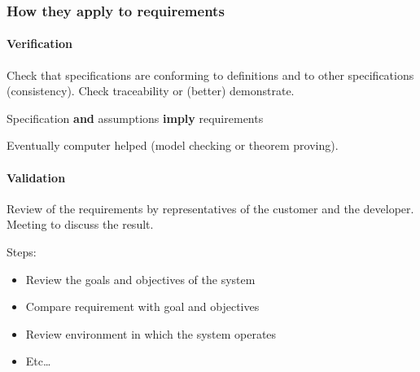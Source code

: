 \subsubsection{How they apply to requirements}

\paragraph{Verification}

Check that specifications are conforming to definitions and to other specifications (consistency). \newline
Check traceability or (better) demonstrate.
\begin{center}
Specification \textbf{and} assumptions \textbf{imply} requirements
\end{center}
Eventually computer helped (model checking or theorem proving).

\paragraph{Validation}

Review of the requirements by representatives of the customer and the developer. Meeting to discuss the result. \newline

Steps:

\begin{itemize}
    \item Review the goals and objectives of the system
    \item Compare requirement with goal and objectives
    \item Review environment in which the system operates
    \item Etc\ldots
\end{itemize}
